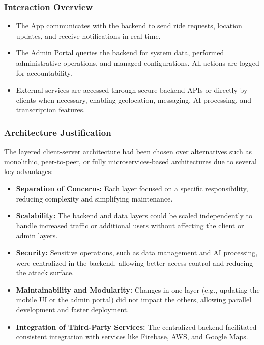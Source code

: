 \subsubsection{Interaction Overview}

\begin{itemize}
 \item The App communicates with the backend to send ride requests,
        location updates, and receive notifications in real time.

 \item The Admin Portal queries the backend for system data, performed
        administrative operations, and managed configurations. All actions are
        logged for accountability.

 \item External services are accessed through secure backend APIs or
        directly by clients when necessary, enabling geolocation, messaging, AI
        processing, and transcription features.
\end{itemize}

\subsubsection{Architecture Justification}

The layered client-server architecture had been chosen over alternatives such as
monolithic, peer-to-peer, or fully microservices-based architectures due to
several key advantages:


\begin{itemize}
 \item \textbf{Separation of Concerns:} Each layer focused on a specific
        responsibility, reducing complexity and simplifying maintenance.

 \item \textbf{Scalability:} The backend and data layers could be scaled
        independently to handle increased traffic or additional users without
        affecting the client or admin layers.

 \item \textbf{Security:} Sensitive operations, such as data management
        and AI processing, were centralized in the backend, allowing better
        access control and reducing the attack surface.

 \item \textbf{Maintainability and Modularity:} Changes in one layer
        (e.g., updating the mobile UI or the admin portal) did not impact the
        others, allowing parallel development and faster deployment.

 \item \textbf{Integration of Third-Party Services:} The centralized
        backend facilitated consistent integration with services like Firebase,
        AWS, and Google Maps.
\end{itemize}


